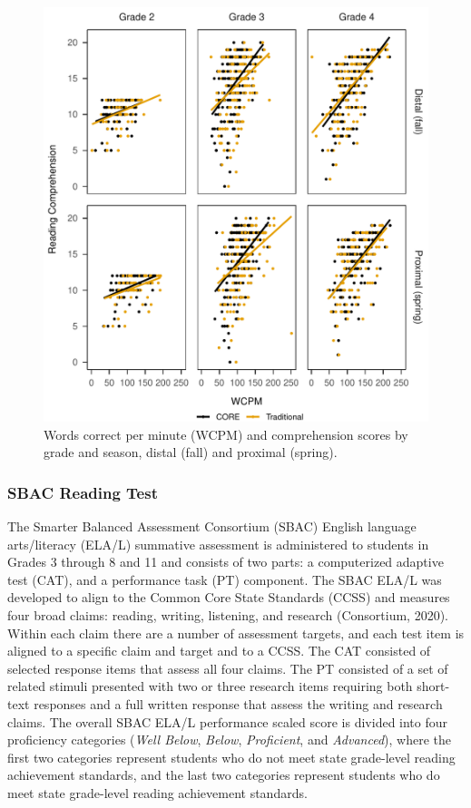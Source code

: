 \documentclass[
  english,
  man, fleqn, noextraspace]{apa6}
\begin{document}
\begin{figure}
\centering
\includegraphics{demo_files/figure-latex/fig-comp-scatter-1.pdf}
\caption{\label{fig:fig-comp-scatter}Words correct per minute (WCPM) and comprehension scores by grade and season, distal (fall) and proximal (spring).}
\end{figure}

\hypertarget{sbac-reading-test}{%
\subsubsection{SBAC Reading Test}\label{sbac-reading-test}}

The Smarter Balanced Assessment Consortium (SBAC) English language arts/literacy (ELA/L) summative assessment is administered to students in Grades 3 through 8 and 11 and consists of two parts: a computerized adaptive test (CAT), and a performance task (PT) component. The SBAC ELA/L was developed to align to the Common Core State Standards (CCSS) and measures four broad claims: reading, writing, listening, and research (Consortium, 2020). Within each claim there are a number of assessment targets, and each test item is aligned to a specific claim and target and to a CCSS. The CAT consisted of selected response items that assess all four claims. The PT consisted of a set of related stimuli presented with two or three research items requiring both short-text responses and a full written response that assess the writing and research claims. The overall SBAC ELA/L performance scaled score is divided into four proficiency categories (\emph{Well Below}, \emph{Below}, \emph{Proficient}, and \emph{Advanced}), where the first two categories represent students who do not meet state grade-level reading achievement standards, and the last two categories represent students who do meet state grade-level reading achievement standards.
\end{document}
